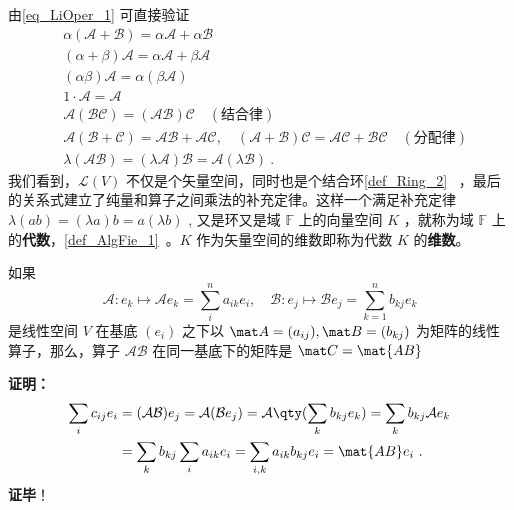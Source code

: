 由\autoref{eq_LiOper_1} 可直接验证
\begin{equation}
\begin{aligned}
&\alpha(\mathcal{A+B})=\alpha\mathcal{A}+\alpha\mathcal{B}\\
&(\alpha+\beta)\mathcal{A}=\alpha\mathcal{A}+\beta\mathcal{A}\\
&(\alpha\beta)\mathcal{A}=\alpha(\beta\mathcal{A})\\
&1\cdot \mathcal{A}=\mathcal A\\
&\mathcal{A}(\mathcal{BC})=(\mathcal{AB})\mathcal C\quad(\text{结合律})\\
&\mathcal A(\mathcal{B+C})=\mathcal{AB+AC},\quad (\mathcal{A+B})\mathcal C=\mathcal{AC+BC}\quad(\text{分配律})\\
&\lambda(\mathcal{AB})=(\lambda\mathcal{A})\mathcal{B}=\mathcal{A}(\lambda \mathcal B)~.
\end{aligned}
\end{equation}
我们看到，$\mathcal{L}(V)$ 不仅是个矢量空间，同时也是个结合环\autoref{def_Ring_2}~ ，最后的关系式建立了纯量和算子之间乘法的补充定律。这样一个满足补充定律 $\lambda(ab)=(\lambda a)b=a(\lambda b)$ , 又是环又是域 $\mathbb{F}$ 上的向量空间 $K$ ，就称为域 $\mathbb{F}$ 上的\textbf{代数}，\autoref{def_AlgFie_1}~。$K$ 作为矢量空间的维数即称为代数 $K$ 的\textbf{维数}。

\begin{theorem}{}\label{the_LiOper_1}
如果
\begin{equation}\label{eq_LiOper_2}
\mathcal{A}: e_k\mapsto \mathcal{A} e_k=\sum_i^{n}a_{ik} e_i,\quad \mathcal{B}: e_j\mapsto  \mathcal{B} e_j=\sum_{k=1}^n b_{kj} e_k
\end{equation}
是线性空间 $V$ 在基底 $( e_i)$ 之下以 $\mat A=(a_{ij}), \mat B=(b_{kj})$ 为矩阵的线性算子，那么，算子 $\mathcal{AB}$ 在同一基底下的矩阵是 $\mat C=\mat{AB}$
\end{theorem}
\textbf{证明：}
\begin{equation}
\begin{aligned}
\sum_i c_{ij} e_i&=(\mathcal{AB}) e_j=\mathcal{A}(\mathcal{B} e_j)=\mathcal{A}\qty(\sum_k b_{kj} e_k)=\sum_k b_{kj}\mathcal{A} e_k\\
&=\sum_k b_{kj}\sum_i a_{ik} e_i=\sum_{i,k}a_{ik}b_{kj} e_i=\mat{AB} e_i~.
\end{aligned}
\end{equation}
\textbf{证毕}！
